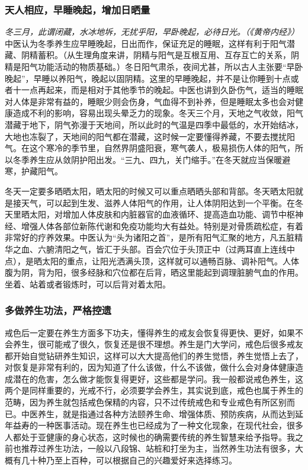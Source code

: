 \subsubsection{天人相应，早睡晚起，增加日晒量}

\textit{冬三月，此谓闭藏，水冰地坼，无扰乎阳，早卧晚起，必待日光。（《黄帝内经》）} 中医认为冬季养生应早睡晚起，日出而作，保证充足的睡眠，这样有利于阳气潜藏、阴精蓄积。（从生理角度来讲，阴精与阳气是互根互用、互存互亡的关系，阴精是阳气功能活动的物质基础。）冬日阳气肃杀，夜间尤甚，所以古人主张要“早卧晚起”，早睡以养阳气，晚起以固阴精。这里的早睡晚起，并不是让你睡到十点或者十一点再起来，而是相对于其他季节的晚起。中医也讲到久卧伤气，适当的睡眠对人体是非常有益的，睡眠少则会伤身，气血得不到补养，但是睡眠太多也会对健康造成不利的影响，容易出现头晕乏力的现象。冬天三个月，天地之气收敛，阳气潜藏于地下，阴气弥漫于天地间，所以此时的气温是四季中最低的，水开始结冰，大地也冻裂了，天地间的阳气都在潜藏，这时候一定要懂得养藏，不要去搅扰阳气。在这个寒冷的季节里，自然界阴盛阳衰，寒气袭人，极易损伤人体的阳气，所以冬季养生应从敛阴护阳出发。“三九、四九，关门缩手。”在冬天就应当保暖避寒，护藏阳气。

冬天一定要多晒晒太阳，晒太阳的时候又可以重点晒晒头部和背部。冬天晒太阳就是接天气，可以起到生发、滋养人体阳气的作用，让人体阴阳达到一个平衡。在冬天里晒太阳，对增加人体皮肤和内脏器官的血液循环、提高造血功能、调节中枢神经、增强人体各部位新陈代谢和免疫功能均大有益处。特别是对骨质疏松症，有着非常好的疗养效果。中医认为“头为诸阳之首”，是所有阳气汇聚的地方，凡五脏精华之血、六腑清阳之气，皆汇于头部。百会穴位于头顶正中（过两耳直上连线中点），是晒太阳的重点，让阳光洒满头顶，这样就可以通畅百脉、调补阳气。人体腹为阴，背为阳，很多经脉和穴位都在后背，晒这里能起到调理脏腑气血的作用。坐着、站着或者锻炼时，可以后背对着太阳。

\subsubsection{多做养生功法，严格控遗}

戒色后一定要在养生方面多下功夫，懂得养生的戒友会恢复得更快、更好，如果不会养生，很可能戒了很久，恢复还是很不理想。养生是门大学问，戒色后很多戒友都开始自觉钻研养生知识，这样可以大大提高他们的养生觉悟，养生觉悟上去了，对恢复是非常有利的，因为知道了什么该做，什么不该做，做什么会对身体健康造成潜在的危害，怎么做才能恢复得更好，这些都是学问。我一般都说戒色养生，这两个是同样重要的，光戒不行，必须要学会养生，其实说到底，戒色也属于养生的范畴，因为养生就包括戒色保精的内容，只不过传统戒色和专业戒色有所区别而已。中医养生，就是指通过各种方法颐养生命、增强体质、预防疾病，从而达到延年益寿的一种医事活动。现在养生也已经成为了一种文化现象，在现代社会，很多人都处于亚健康的身心状态，这时候也的确需要传统的养生智慧来给予指导。我之前也推荐过养生功法，一般以八段锦、站桩和打坐为主，当然养生功法有很多，大概有几十种乃至上百种，可以根据自己的兴趣爱好来选择练习。

